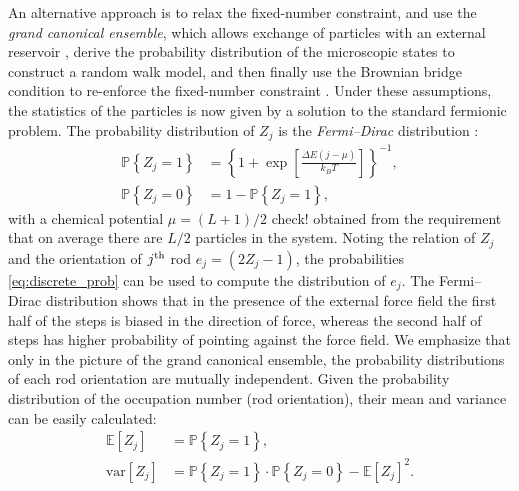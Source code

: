 \documentclass[aps,showpacs,twocolumn,floatfix,prx,superscriptaddress]{revtex4-1}
\begin{document}
An alternative approach is to relax the fixed-number constraint, and use the \emph{grand canonical ensemble}, which allows exchange of particles with an external reservoir \cite{Chandler1987,Huang2001}, derive the probability distribution of the microscopic states to construct a random walk model, and then finally use the Brownian bridge condition to re-enforce the fixed-number constraint \cite{Lin2015}. Under these assumptions, the statistics of the particles is now given by a solution to the standard fermionic problem.  The probability distribution of $Z_j$  is the {\em Fermi--Dirac} distribution \cite{Chandler1987,Lin2015}:
\begin{subequations}
    \label{eq:discrete_prob}
    \begin{align}
        \mathbb{P} \left\{ Z_j = 1\right\} & =  \left\{1+\exp\left[\frac{ \Delta
                    E \left(j - \mu \right) }{k_B T}\right]\right\}^{-1}, \\
        \mathbb{P} \left\{ Z_j = 0\right\} & = 1 - \mathbb{P} \left\{ Z_j =
            1\right\},
    \end{align}
\end{subequations}
with a chemical potential $\mu = (L+1)/2$ {\color{red} check!} obtained from the requirement that on average there are $L/2$ particles in the system.
Noting the relation of $Z_j$ and the orientation of $j^{\rm th}$ rod $e_j = \left(2Z_j -1\right)$, the probabilities \eqref{eq:discrete_prob} can be used to compute the distribution of $e_j$. The Fermi--Dirac distribution shows that in the presence of the external force field the first half of the steps is biased in the direction of force, whereas the second half of steps has higher probability of pointing against the force field.
We emphasize that only in the picture of the grand canonical ensemble, the probability distributions of each rod orientation are mutually independent.
Given the probability distribution of the occupation number (rod orientation), their mean and variance can be easily calculated:
\begin{subequations}
    \begin{align}
        \label{eq:zmean}
        \mathbb{E}\left[Z_j\right] & = \mathbb{P}\left\{Z_j=1\right\},\\
        \label{eq:zvar}
        \text{var}\left[Z_j\right] & = \mathbb{P}\left\{Z_j=1\right\} \cdot \mathbb{P}\left\{ Z_j=0\right\} 
        - \mathbb{E}\left[Z_j\right]^2.
    \end{align}
\end{subequations}
\end{document}

